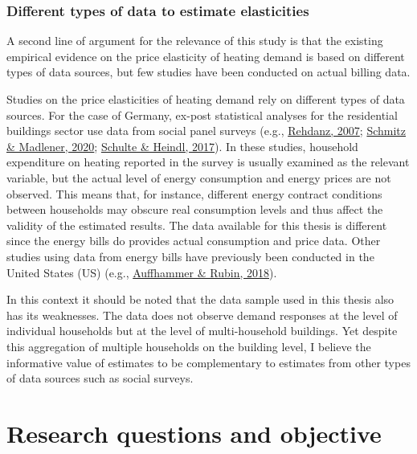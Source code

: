 \documentclass[12pt,twoside]{reedthesis}
\begin{document}
\hypertarget{different-types-of-data-to-estimate-elasticities}{%
\subsubsection*{Different types of data to estimate elasticities}\label{different-types-of-data-to-estimate-elasticities}}

A second line of argument for the relevance of this study is that the existing empirical evidence on the price elasticity of heating demand is based on different types of data sources, but few studies have been conducted on actual billing data.

Studies on the price elasticities of heating demand rely on different types of data sources. For the case of Germany, ex-post statistical analyses for the residential buildings sector use data from social panel surveys (e.g., \protect\hyperlink{ref-rehdanz07}{Rehdanz, 2007}; \protect\hyperlink{ref-schmitz_madlener20}{Schmitz \& Madlener, 2020}; \protect\hyperlink{ref-schulte_heindl17}{Schulte \& Heindl, 2017}). In these studies, household expenditure on heating reported in the survey is usually examined as the relevant variable, but the actual level of energy consumption and energy prices are not observed. This means that, for instance, different energy contract conditions between households may obscure real consumption levels and thus affect the validity of the estimated results. The data available for this thesis is different since the energy bills do provides actual consumption and price data. Other studies using data from energy bills have previously been conducted in the United States (US) (e.g., \protect\hyperlink{ref-auffhammer_rubin18}{Auffhammer \& Rubin, 2018}).

In this context it should be noted that the data sample used in this thesis also has its weaknesses. The data does not observe demand responses at the level of individual households but at the level of multi-household buildings. Yet despite this aggregation of multiple households on the building level, I believe the informative value of estimates to be complementary to estimates from other types of data sources such as social surveys.

\hypertarget{objective}{%
\section{Research questions and objective}\label{objective}}
\end{document}
